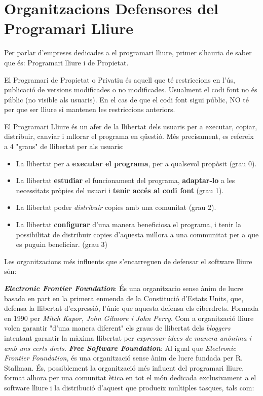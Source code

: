 \section{Organitzacions Defensores del Programari Lliure}

Per parlar d'empreses dedicades a el programari lliure, primer s'hauria de saber que és: Programari lliure i de Propietat.

El Programari de Propietat o Privatiu és aquell que té restriccions en l'ús, publicació de versions modificades o no modificades. Usualment el codi font no és públic (no visible als usuaris). En el cas de que el codi font sigui públic, NO té per que ser lliure si mantenen les restriccions anteriors. \cite{ProgPro}

El Programari Lliure és un afer de la llibertat dels usuaris per a executar, copiar, distribuir, canviar i mllorar el programa en qüestió. Més precisament, es refereix a 4 "graus" de llibertat per als usuaris:

	\begin{itemize}
		\item La llibertat per a \textbf{executar el programa}, per a qualsevol propòsit (grau  0).
		\item La llibertat \textbf{estudiar} el funcionament del programa, \textbf{adaptar-lo} a les 			necessitats pròpies del usuari i \textbf{tenir accés al codi font} (grau 1).
		\item La llibertat poder \textit{distribuir} copies amb una comunitat (grau 2).
		\item La llibertat \textbf{configurar} d'una manera beneficiosa el programa, i tenir la 		possibilitat de	distribuir copies d'aquesta millora a una communitat per a que es puguin 			beneficiar. (grau 3)
	\end{itemize}

Les organitzacions més influents que s'encarreguen de defensar el software lliure són: 
 
\textbf{\emph{Electronic Frontier Foundation}}: És una organitzacio sense ànim de lucre basada en part en la primera enmenda de la Constitució d'Estats Units, que, defensa la llibertat d'expressió, l'únic que aquesta defensa els ciberdrets. Formada en 1990 per \textit{Mitch Kapor, John Gilmore i John Perry}. Com a organització lliure volen garantir "d'una manera diferent" els graus de llibertat dels \emph{bloggers} intentant garantir la màxima llibertat per \textit{expressar idees de manera anònima i amb uns certs drets.} \cite{OrgDefEFF}
 \cite{OrgDefEFFII}
\textbf{\emph{Free Software Foundation}}: Al igual que \emph{Electronic Frontier Foundation}, és una 		organització sense ànim de lucre fundada per R. Stallman. És, possiblement la organització més 		influent del programari lliure, format alhora per una comunitat ètica en tot el món dedicada 		exclusivament a el software lliure i la distribució d'aquest que produeix multiples tasques, tals com:

